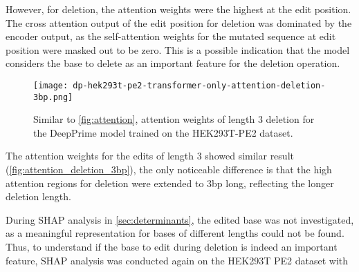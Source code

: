 However, for deletion, the attention weights were the highest at the edit position. The cross attention output of the edit position for deletion was dominated by the encoder output, as the self-attention weights for the mutated sequence at edit position were masked out to be zero. This is a possible indication that the model considers the base to delete as an important feature for the deletion operation.

\begin{figure}
    \centering
    \texttt{[image: dp-hek293t-pe2-transformer-only-attention-deletion-3bp.png]}
    \caption[Attention weights for 3-bp deletion of the DeepPrime model trained on the HEK293T-PE2 dataset]{Similar to \autoref{fig:attention}, attention weights of length 3 deletion for the DeepPrime model trained on the HEK293T-PE2 dataset.}
    \label{fig:attention_deletion_3bp}
\end{figure}

The attention weights for the edits of length 3 showed similar result (\autoref{fig:attention_deletion_3bp}), the only noticeable difference is that the high attention regions for deletion were extended to 3bp long, reflecting the longer deletion length.

During SHAP analysis in \autoref{sec:determinants}, the edited base was not investigated, as a meaningful representation for bases of different lengths could not be found. Thus, to understand if the base to edit during deletion is indeed an important feature, SHAP analysis was conducted again on the HEK293T PE2 dataset with 